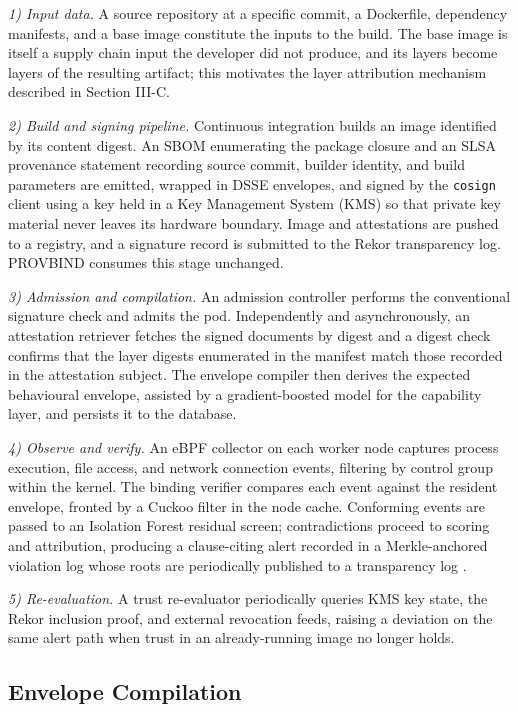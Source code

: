 \documentclass[conference]{IEEEtran}
\begin{document}
\textit{1) Input data.} A source repository at a specific commit, a
Dockerfile, dependency manifests, and a base image constitute the inputs
to the build. The base image is itself a supply chain input the
developer did not produce, and its layers become layers of the resulting
artifact; this motivates the layer attribution mechanism described in
Section III-C.

\textit{2) Build and signing pipeline.} Continuous integration builds an
image identified by its content digest. An SBOM enumerating the package
closure and an SLSA provenance statement recording source commit, builder
identity, and build parameters are emitted, wrapped in DSSE envelopes,
and signed by the \texttt{cosign} client using a key held in a Key
Management System (KMS) so that private key material never leaves its
hardware boundary. Image and attestations are pushed to a registry, and
a signature record is submitted to the Rekor transparency log. PROVBIND
consumes this stage unchanged.

\textit{3) Admission and compilation.} An admission controller performs
the conventional signature check and admits the pod. Independently and
asynchronously, an attestation retriever fetches the signed documents by
digest and a digest check confirms that the layer digests enumerated in
the manifest match those recorded in the attestation subject. The
envelope compiler then derives the expected behavioural envelope,
assisted by a gradient-boosted model for the capability layer, and
persists it to the database.

\textit{4) Observe and verify.} An eBPF collector on each worker node
captures process execution, file access, and network connection events,
filtering by control group within the kernel. The binding verifier
compares each event against the resident envelope, fronted by a Cuckoo
filter in the node cache. Conforming events are passed to an Isolation
Forest residual screen; contradictions proceed to scoring and
attribution, producing a clause-citing alert recorded in a Merkle-anchored
violation log \cite{merkle1987} whose roots are periodically published
to a transparency log \cite{rfc6962}.

\textit{5) Re-evaluation.} A trust re-evaluator periodically queries KMS
key state, the Rekor inclusion proof, and external revocation feeds,
raising a deviation on the same alert path when trust in an
already-running image no longer holds.

\subsection{Envelope Compilation}
\end{document}
